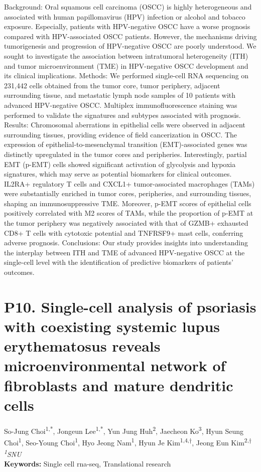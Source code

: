\noindent
Background: Oral squamous cell carcinoma (OSCC) is highly heterogeneous and associated with human papillomavirus (HPV) infection or alcohol and tobacco exposure. Especially, patients with HPV-negative OSCC have a worse prognosis compared with HPV-associated OSCC patients. However, the mechanisms driving tumorigenesis and progression of HPV-negative OSCC are poorly understood. We sought to investigate the association between intratumoral heterogeneity (ITH) and tumor microenvironment (TME) in HPV-negative OSCC development and its clinical implications. Methods: We performed single-cell RNA sequencing on 231,442 cells obtained from the tumor core, tumor periphery, adjacent surrounding tissue, and metastatic lymph node samples of 10 patients with advanced HPV-negative OSCC. Multiplex immunofluorescence staining was performed to validate the signatures and subtypes associated with prognosis. Results: Chromosomal aberrations in epithelial cells were observed in adjacent surrounding tissues, providing evidence of field cancerization in OSCC. The expression of epithelial-to-mesenchymal transition (EMT)-associated genes was distinctly upregulated in the tumor cores and peripheries. Interestingly, partial EMT (p-EMT) cells showed significant activation of glycolysis and hypoxia signatures, which may serve as potential biomarkers for clinical outcomes. IL2RA+ regulatory T cells and CXCL1+ tumor-associated macrophages (TAMs) were substantially enriched in tumor cores, peripheries, and surrounding tissues, shaping an immunosuppressive TME. Moreover, p-EMT scores of epithelial cells positively correlated with M2 scores of TAMs, while the proportion of p-EMT at the tumor periphery was negatively associated with that of GZMB+ exhausted CD8+ T cells with cytotoxic potential and TNFRSF9+ mast cells, conferring adverse prognosis. Conclusions: Our study provides insights into understanding the interplay between ITH and TME of advanced HPV-negative OSCC at the single-cell level with the identification of predictive biomarkers of patients’ outcomes.
\newpage

\section*{P10. Single-cell analysis of psoriasis with coexisting systemic lupus erythematosus reveals microenvironmental network of fibroblasts and mature dendritic cells}

\begin{center}
So-Jung Choi\textsuperscript{1,*}, Jongeun Lee\textsuperscript{1,*}, Yun Jung Huh\textsuperscript{2}, Jaecheon Ko\textsuperscript{3}, Hyun Seung Choi\textsuperscript{1}, Seo-Young Choi\textsuperscript{1}, Hyo Jeong Nam\textsuperscript{1}, Hyun Je Kim\textsuperscript{1,4,†}, Jeong Eun Kim\textsuperscript{2,†} \\
\vspace{0.3cm}
\textit{\textsuperscript{1}SNU} \\
\vspace{0.3cm}
\textbf{Keywords:} Single cell rna-seq, Translational research
\end{center}

